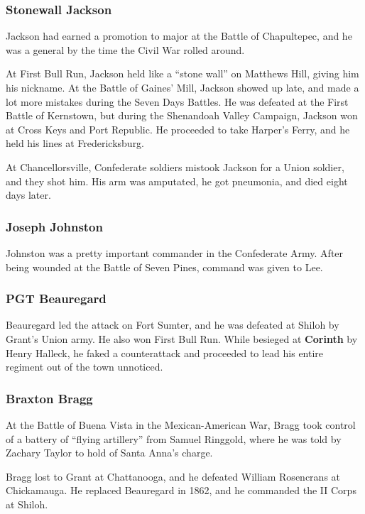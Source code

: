 \subsubsection*{Stonewall Jackson}

Jackson had earned a promotion to major at the Battle of Chapultepec,
and he was a general by the time the Civil War rolled around.

At First Bull Run, Jackson held like a ``stone wall'' on Matthews Hill, giving him his nickname.
At the Battle of Gaines' Mill, Jackson showed up late, and made a lot more mistakes during the Seven Days Battles.
He was defeated at the First Battle of Kernstown,
but during the Shenandoah Valley Campaign, Jackson won at Cross Keys and Port Republic.
He proceeded to take Harper's Ferry, and he held his lines at Fredericksburg.

At Chancellorsville, Confederate soldiers mistook Jackson for a Union soldier, and they shot him.
His arm was amputated, he got pneumonia, and died eight days later.

\subsubsection*{Joseph Johnston}

Johnston was a pretty important commander in the Confederate Army.
After being wounded at the Battle of Seven Pines, command was given to Lee.

\subsubsection*{PGT Beauregard}

Beauregard led the attack on Fort Sumter, and he was defeated at Shiloh by Grant's Union army.
He also won First Bull Run.
While besieged at \textbf{Corinth} by Henry Halleck,
he faked a counterattack and proceeded to lead his entire regiment out of the town unnoticed.

\subsubsection*{Braxton Bragg}

At the Battle of Buena Vista in the Mexican-American War,
Bragg took control of a battery of ``flying artillery'' from Samuel Ringgold,
where he was told by Zachary Taylor to hold of Santa Anna's charge.

Bragg lost to Grant at Chattanooga, and he defeated William Rosencrans at Chickamauga.
He replaced Beauregard in 1862, and he commanded the II Corps at Shiloh.

